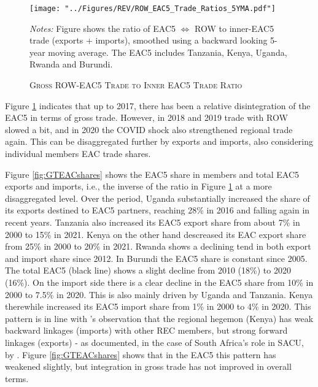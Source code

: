 \documentclass[a4paper]{article}
\begin{document}
\begin{figure}[h!] \vspace{-1mm}
\centering
\caption{\label{fig:EAC_ROW_Ratios} \textsc{Gross ROW-EAC5 Trade to Inner EAC5 Trade Ratio}}
\vspace{2mm}
\texttt{[image: "../Figures/REV/ROW\_EAC5\_Trade\_Ratios\_5YMA.pdf"]} \\
\raggedright
\scriptsize 
\emph{Notes:} Figure shows the ratio of EAC5 $\Leftrightarrow$ ROW to inner-EAC5 trade (exports + imports), smoothed using a backward looking 5-year moving average. The EAC5 includes Tanzania, Kenya, Uganda, Rwanda and Burundi.
\vspace{-10mm}
\end{figure}
\FloatBarrier

Figure \ref{fig:EAC_ROW_Ratios} indicates that up to 2017, there has been a relative disintegration of the EAC5 in terms of gross trade. However, in 2018 and 2019 trade with ROW slowed a bit, and in 2020 the COVID shock also strengthened regional trade again. %
This can be disaggregated further by exports and imports, also considering individual members EAC trade shares. \newline 

Figure \ref{fig:GTEACshares} shows the EAC5 share in members and total EAC5 exports and imports, i.e., the inverse of the ratio in Figure \ref{fig:EAC_ROW_Ratios} at a more disaggregated level. Over the period, Uganda substantially increased the share of its exports destined to EAC5 partners, reaching 28\% in 2016 and falling again in recent years. Tanzania also increased its EAC5 export share from about 7\% in 2000 to 15\% in 2021. Kenya on the other hand descreased its EAC export share from 25\% in 2000 to 20\% in 2021. Rwanda shows a declining tend in both export and import share since 2012. In Burundi the EAC5 share is constant since 2005. The total EAC5 (black line) shows a slight decline from 2010 (18\%) to 2020 (16\%). On the import side there is a clear decline in the EAC5 share from 10\% in 2000 to 7.5\% in 2020. This is also mainly driven by Uganda and Tanzania. Kenya therewhile increased its EAC5 import share from 1\% in 2000 to 4\% in 2020. This pattern is in line with \citet{obasaju2021regional}'s observation that the regional hegemon (Kenya) has weak backward linkages (imports) with other REC members, but strong forward linkages (exports) - as documented, in the case of South Africa's role in SACU, by \citet{engel2016sacu}. Figure \ref{fig:GTEACshares} shows that in the EAC5 this pattern has weakened slightly, but integration in gross trade has not improved in overall terms. 
\end{document}
